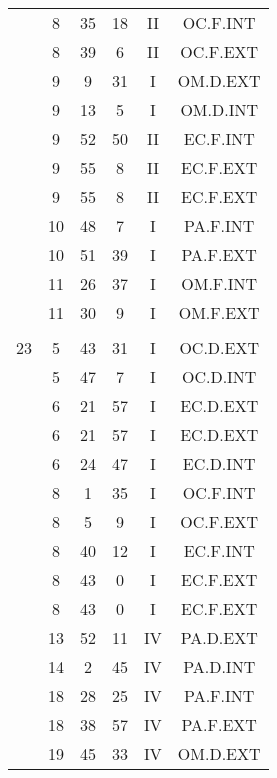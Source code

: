 \documentclass[12pt, a4paper]{article}
\begin{document}
\begin{multicols}{3}
{\begin{tabular}{c c c c c c}
	 	 	 	 & 8 & 35 & 18 & II & OC.F.INT\\%
	 	 	 	 & 8 & 39 & 6 & II & OC.F.EXT\\%
	 	 	 	 & 9 & 9 & 31 & I & OM.D.EXT\\%
	 	 	 	 & 9 & 13 & 5 & I & OM.D.INT\\%
	 	 	 	 & 9 & 52 & 50 & II & EC.F.INT\\%
	 	 	 	 & 9 & 55 & 8 & II & EC.F.EXT\\%
	 	 	 	 & 9 & 55 & 8 & II & EC.F.EXT\\%
	 	 	 	 & 10 & 48 & 7 & I & PA.F.INT\\%
	 	 	 	 & 10 & 51 & 39 & I & PA.F.EXT\\%
	 	 	 	 & 11 & 26 & 37 & I & OM.F.INT\\%
	 	 	 	 & 11 & 30 & 9 & I & OM.F.EXT\\%
	 	 	 	 & & & & & \\%
	 	 	 	23 & 5 & 43 & 31 & I & OC.D.EXT\\%
	 	 	 	 & 5 & 47 & 7 & I & OC.D.INT\\%
	 	 	 	 & 6 & 21 & 57 & I & EC.D.EXT\\%
	 	 	 	 & 6 & 21 & 57 & I & EC.D.EXT\\%
	 	 	 	 & 6 & 24 & 47 & I & EC.D.INT\\%
	 	 	 	 & 8 & 1 & 35 & I & OC.F.INT\\%
	 	 	 	 & 8 & 5 & 9 & I & OC.F.EXT\\%
	 	 	 	 & 8 & 40 & 12 & I & EC.F.INT\\%
	 	 	 	 & 8 & 43 & 0 & I & EC.F.EXT\\%
	 	 	 	 & 8 & 43 & 0 & I & EC.F.EXT\\%
	 	 	 	 & 13 & 52 & 11 & IV & PA.D.EXT\\%
	 	 	 	 & 14 & 2 & 45 & IV & PA.D.INT\\%
	 	 	 	 & 18 & 28 & 25 & IV & PA.F.INT\\%
	 	 	 	 & 18 & 38 & 57 & IV & PA.F.EXT\\%
	 	 	 	 & 19 & 45 & 33 & IV & OM.D.EXT\\%
	 	 \end{tabular}
 	}
\end{multicols}
\end{document}
